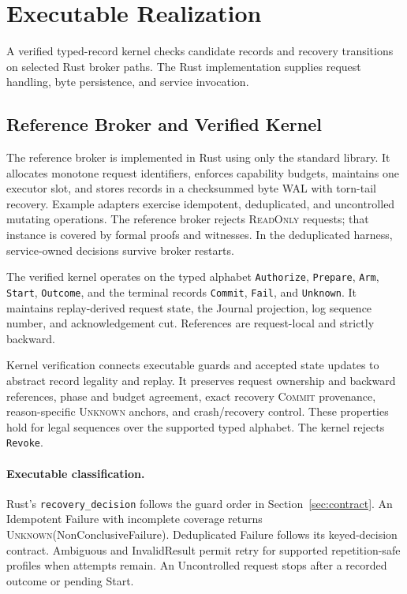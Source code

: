 \documentclass[acmsmall,screen,review,anonymous]{acmart}
\newcommand{\Unknown}{\textsc{Unknown}\xspace}
\newcommand{\Commit}{\textsc{Commit}\xspace}
\newcommand{\ReadOnly}{\textsc{ReadOnly}\xspace}
\begin{document}
\section{Executable Realization}
\label{sec:implementation}

A verified typed-record kernel checks candidate records and recovery
transitions on selected Rust broker paths. The Rust implementation supplies
request handling, byte persistence, and service invocation.

\subsection{Reference Broker and Verified Kernel}

The reference broker is implemented in Rust using only the
standard library. It allocates monotone request identifiers,
enforces capability budgets, maintains one executor slot, and
stores records in a checksummed byte WAL with torn-tail recovery.
Example adapters exercise idempotent, deduplicated, and
uncontrolled mutating operations. The reference broker rejects \ReadOnly requests; that instance is covered by
formal proofs and witnesses. In the deduplicated harness, service-owned
decisions survive broker restarts.

The verified kernel operates on the typed alphabet \texttt{Authorize},
\texttt{Prepare}, \texttt{Arm}, \texttt{Start}, \texttt{Outcome}, and the
terminal records \texttt{Commit}, \texttt{Fail}, and \texttt{Unknown}.
It maintains replay-derived request state, the Journal projection, log
sequence number, and acknowledgement cut. References are request-local
and strictly backward.

Kernel verification connects executable guards and accepted state updates
to abstract record legality and replay. It preserves request ownership and
backward references, phase and budget agreement, exact recovery \Commit
provenance, reason-specific \Unknown anchors, and crash/recovery control.
These properties hold for legal sequences over the supported typed alphabet.
The kernel rejects \texttt{Revoke}.

\paragraph{Executable classification.}
Rust's \texttt{recovery\_decision} follows the guard order in
Section~\ref{sec:contract}. An Idempotent Failure with incomplete coverage
returns \Unknown(NonConclusiveFailure). Deduplicated Failure follows its
keyed-decision contract. Ambiguous and InvalidResult permit retry for
supported repetition-safe profiles when attempts remain. An Uncontrolled
request stops after a recorded outcome or pending Start.
\end{document}
